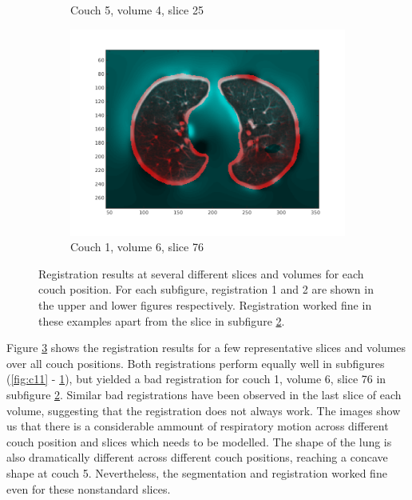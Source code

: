 \documentclass[11pt,a4paper,oneside]{report}
\begin{document}
\begin{figure}[H]
\begin{subfigure}[b]{0.3\textwidth}
	  \caption{Couch 5, volume 4, slice 25}
	  \label{fig:c22}
  \end{subfigure}
  \begin{subfigure}[b]{0.3\textwidth}
	  \includegraphics[width=\textwidth, trim=20 20 20 20]{figures/reg2/reg1_6_76.png}
	  \caption{Couch 1, volume 6, slice 76}
	  \label{fig:c23}
  \end{subfigure}
  \caption{Registration results at several different slices and volumes for each couch position. For each subfigure, registration 1 and 2 are shown in the upper and lower figures respectively. Registration worked fine in these examples apart from the slice in subfigure \ref{fig:c23}.}
  \label{fig:c1vis}
\end{figure}


Figure \ref{fig:c1vis} shows the registration results for a few representative slices and volumes over all couch positions. Both registrations perform equally well in subfigures (\ref{fig:c11} - \ref{fig:c22}), but yielded a bad registration for couch 1, volume 6, slice 76 in subfigure \ref{fig:c23}. Similar bad registrations have been observed in the last slice of each volume, suggesting that the registration does not always work. The images show us that there is a considerable ammount of respiratory motion across different couch position and slices which needs to be modelled. The shape of the lung is also dramatically different across different couch positions, reaching a concave shape at couch 5. Nevertheless, the segmentation and registration worked fine even for these nonstandard slices.
\end{document}
